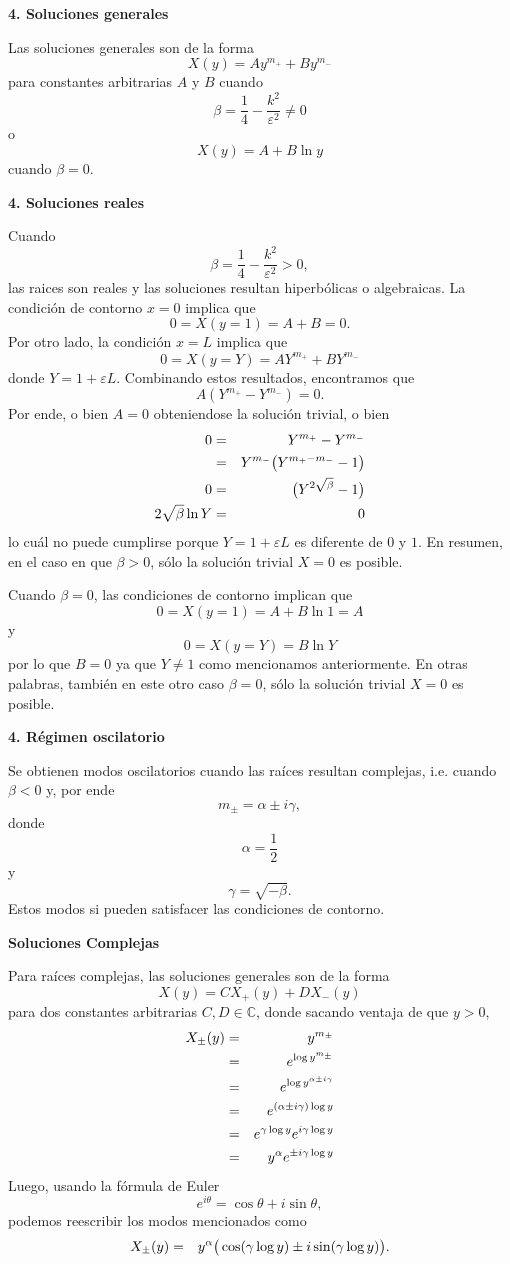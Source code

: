 \documentclass[11pt,spanish]{article}
\newcommand{\CC}{\mathbb{C}}
\begin{document}
{\bf 4. Soluciones generales}

Las soluciones generales son de la forma
$$
X(y) = Ay^{m_+} + By^{m_-}
$$
para constantes arbitrarias $A$ y $B$ cuando
$$
\beta = \frac{1}{4} - \frac{k^2}{\varepsilon^2} \neq 0
$$
o
$$
X(y) = A + B\ln y
$$
cuando $\beta=0$.


{\bf 4. Soluciones reales}

Cuando
$$
\beta = \frac{1}{4} - \frac{k^2}{\varepsilon^2} > 0,
$$
las raices son reales y las soluciones resultan hiperbólicas o algebraicas.
La condici\'on de contorno $x=0$ implica que
$$
0 = X(y=1) = A + B = 0.
$$
Por otro lado, la condici\'on $x=L$ implica que
$$
0 = X(y=Y) = AY^{m_+} + BY^{m_-}
$$
donde $Y=1+\varepsilon L$.
Combinando estos resultados, encontramos que
$$
A(Y^{m_+}-Y^{m_-}) = 0.
$$
Por ende, o bien $A=0$ obteniendose la soluci\'on trivial, o bien
\begin{eqnarray}
0
&=&
Y^{m_+}-Y^{m_-}
\notag
\\
&=&
Y^{m_-}
\big(
Y^{m_+-m_-}
-
1
\big)
\notag
\\
0
&=&
\big(
Y^{2\sqrt{\beta}}
-
1
\big)
\notag
\\
2\sqrt{\beta}
\ln Y
&=&
0
\notag
\end{eqnarray}
lo cu\'al no puede cumplirse porque $Y=1+\varepsilon L$ es diferente de $0$ y $1$.
En resumen, en el caso en que $\beta>0$, s\'olo la soluci\'on trivial $X=0$ es posible.

Cuando $\beta=0$, las condiciones de contorno implican que
$$
0 = X(y=1) = A + B \ln 1 = A
$$
y
$$
0 = X(y=Y) = B \ln Y 
$$
por lo que $B=0$ ya que $Y\neq 1$ como mencionamos anteriormente.
En otras palabras, tambi\'en en este otro caso $\beta=0$, s\'olo la soluci\'on trivial $X=0$ es posible.

{\bf 4. R\'egimen oscilatorio}

Se obtienen modos oscilatorios cuando las ra\'ices resultan complejas, i.e. cuando $\beta<0$ y, por ende
$$
m_{\pm}=\alpha\pm i\gamma,
$$
donde
$$
\alpha = \frac{1}{2}
$$
y
$$
\gamma = \sqrt{-\beta}.
$$
Estos modos si pueden satisfacer las condiciones de contorno.

{\bf Soluciones Complejas}

Para ra\'ices complejas, las soluciones generales son de la forma
$$
X(y)
=
CX_+(y)
+
DX_-(y)
$$
para dos constantes arbitrarias $C,D\in \CC$, donde sacando ventaja de que $y>0$,
\begin{eqnarray}
X_{\pm}(y)
&=&
y^{m_{\pm}}
\notag
\\
&=&
e^{\log y^{m_{\pm}}}
\notag
\\
&=&
e^{\log y^{\alpha\pm i\gamma}}
\notag
\\
&=&
e^{(\alpha\pm i\gamma)\log y}
\notag
\\
&=&
e^{\gamma\log y}
e^{i\gamma\log y}
\notag
\\
&=&
y^{\alpha}
e^{\pm i\gamma\log y}
\notag
\end{eqnarray}
Luego, usando la fórmula de Euler
$$
e^{i\theta} = \cos\theta + i\sin \theta,
$$
podemos reescribir los modos mencionados como
\begin{eqnarray}
X_{\pm}(y)
&=&
y^{\alpha}
\big(
\cos(\gamma \log y)
\pm 
i\sin(\gamma \log y)
\big).
\notag
\end{eqnarray}
\end{document}
